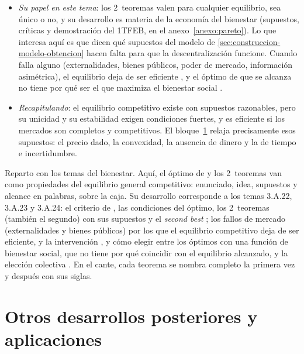 \documentclass[11pt]{article}
\begin{document}
\begin{itemize}
\item \emph{Su papel en este tema}: los 2~teoremas valen para cualquier equilibrio, sea único o no, y su desarrollo es materia de la economía del bienestar  (supuestos, críticas y demostración del 1TFEB, en el anexo~\ref{anexo:pareto}). Lo que interesa aquí es que dicen qué supuestos del modelo de \ref{sec:construccion-modelo-obtencion} hacen falta para que la descentralización funcione. Cuando falla alguno (externalidades, bienes públicos, poder de mercado, información asimétrica), el equilibrio deja de ser eficiente  , y el óptimo de  que se alcanza no tiene por qué ser el que maximiza el bienestar social .
\item \emph{Recapitulando}: el equilibrio competitivo existe con supuestos razonables, pero su unicidad y su estabilidad exigen condiciones fuertes, y es eficiente si los mercados son completos y competitivos. El bloque~\ref{sec:otros-desarrollos-posteriores} relaja precisamente esos supuestos: el precio dado, la convexidad, la ausencia de dinero y la de tiempo e incertidumbre.
\end{itemize}

\begin{notaopositor}
Reparto con los temas del bienestar. Aquí, el óptimo de  y los 2~teoremas van como propiedades del equilibrio general competitivo: enunciado, idea, supuestos y alcance en palabras, sobre la caja. Su desarrollo corresponde a los temas 3.A.22, 3.A.23 y 3.A.24: el criterio de , las condiciones del óptimo, los 2~teoremas (también el segundo) con sus supuestos y el \emph{second best} ; los fallos de mercado (externalidades y bienes públicos) por los que el equilibrio competitivo deja de ser eficiente, y la intervención , y cómo elegir entre los óptimos con una función de bienestar social, que no tiene por qué coincidir con el equilibrio alcanzado, y la elección colectiva . En el cante, cada teorema se nombra completo la primera vez y después con sus siglas.
\end{notaopositor}

\section{Otros desarrollos posteriores y aplicaciones}\label{sec:otros-desarrollos-posteriores}
\end{document}
